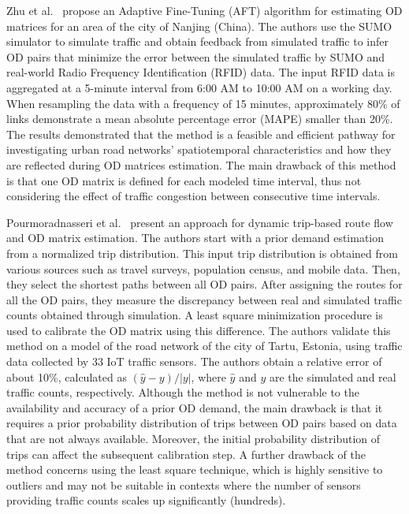 Zhu et al.~\cite{zhu_demand_2020} propose an Adaptive Fine-Tuning (AFT) algorithm for estimating OD matrices for an area of the city of Nanjing (China). The authors use the SUMO simulator to simulate traffic and obtain feedback from simulated traffic to infer OD pairs that minimize the error between the simulated traffic by SUMO and real-world Radio Frequency Identification (RFID) data. The input RFID data is aggregated at a 5-minute interval from 6:00 AM to 10:00 AM on a working day. When resampling the data with a frequency of 15 minutes, approximately 80\% of links demonstrate a mean absolute percentage error (MAPE) smaller than 20\%. The results demonstrated that the method is a feasible and efficient pathway for investigating urban road networks' spatiotemporal characteristics and how they are reflected during OD matrices estimation.
The main drawback of this method is that one OD matrix is defined for each modeled time interval, thus not considering the effect of traffic congestion between consecutive time intervals.

Pourmoradnasseri et al.~\cite{pourmoradnasseri_leveraging_2023} present an approach for dynamic trip-based route flow and OD matrix estimation. The authors start with a prior demand estimation from a normalized trip distribution. This input trip distribution is obtained from various sources such as travel surveys, population census, and mobile data. Then, they select the shortest paths between all OD pairs. After assigning the routes for all the OD pairs, they measure the discrepancy between real and simulated traffic counts obtained through simulation. A least square minimization procedure is used to calibrate the OD matrix using this difference. The authors validate this method on a model of the road network of the city of Tartu, Estonia, using traffic data collected by 33 IoT traffic sensors. The authors obtain a relative error of about 10\%, calculated as ${(\hat{y}-y)}/{|y|}$, where $\hat{y}$ and $y$ are the simulated and real traffic counts, respectively. Although the method is not vulnerable to the availability and accuracy of a prior OD demand, the main drawback is that it requires a prior probability distribution of trips between OD pairs based on data that are not always available. Moreover, the initial probability distribution of trips can affect the subsequent calibration step. A further drawback of the method concerns using the least square technique, which is highly sensitive to outliers and may not be suitable in contexts where the number of sensors providing traffic counts scales up significantly (hundreds).

